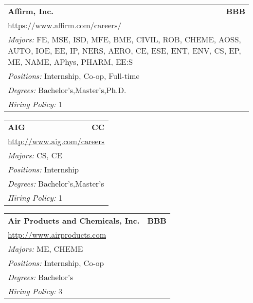 \documentclass[twoside]{article}
\begin{document}
\begin{center}
\begin{multicols}{3}
\begin{FlushLeft}
\begin{minipage}{.9\columnwidth}\begin{tabularx}{.95\columnwidth}{Xr}
                 {\Large\bf Affirm, Inc.} & {\Large\bf BBB}\\
    \multicolumn{2}{p{.95\columnwidth}}{\url{https://www.affirm.com/careers/}}\\
    \multicolumn{2}{p{.95\columnwidth}}{\emph{Majors:} FE, MSE, ISD, MFE, BME, CIVIL, ROB, CHEME, AOSS, AUTO, IOE, EE, IP, NERS, AERO, CE, ESE, ENT, ENV, CS, EP, ME, NAME, APhys, PHARM, EE:S}\\
    \multicolumn{2}{p{.95\columnwidth}}{\emph{Positions:} Internship, Co-op, Full-time}\\
    \multicolumn{2}{p{.95\columnwidth}}{\emph{Degrees:} Bachelor's,Master's,Ph.D.}\\
    \multicolumn{2}{p{.95\columnwidth}}{\emph{Hiring Policy:} 1}\\
    \end{tabularx}
    
\end{minipage}
 
\begin{minipage}{.9\columnwidth}\begin{tabularx}{.95\columnwidth}{Xr}
                 {\Large\bf AIG} & {\Large\bf CC}\\
    \multicolumn{2}{p{.95\columnwidth}}{\url{http://www.aig.com/careers}}\\
    \multicolumn{2}{p{.95\columnwidth}}{\emph{Majors:} CS, CE}\\
    \multicolumn{2}{p{.95\columnwidth}}{\emph{Positions:} Internship}\\
    \multicolumn{2}{p{.95\columnwidth}}{\emph{Degrees:} Bachelor's,Master's}\\
    \multicolumn{2}{p{.95\columnwidth}}{\emph{Hiring Policy:} 1}\\
    \end{tabularx}
    
\end{minipage}
 
\begin{minipage}{.9\columnwidth}\begin{tabularx}{.95\columnwidth}{Xr}
                 {\Large\bf Air Products and Chemicals, Inc.} & {\Large\bf BBB}\\
    \multicolumn{2}{p{.95\columnwidth}}{\url{http://www.airproducts.com}}\\
    \multicolumn{2}{p{.95\columnwidth}}{\emph{Majors:} ME, CHEME}\\
    \multicolumn{2}{p{.95\columnwidth}}{\emph{Positions:} Internship, Co-op}\\
    \multicolumn{2}{p{.95\columnwidth}}{\emph{Degrees:} Bachelor's}\\
    \multicolumn{2}{p{.95\columnwidth}}{\emph{Hiring Policy:} 3}\\
    \end{tabularx}
    

\end{minipage}
\end{FlushLeft}
\end{multicols}
\end{center}
\end{document}
